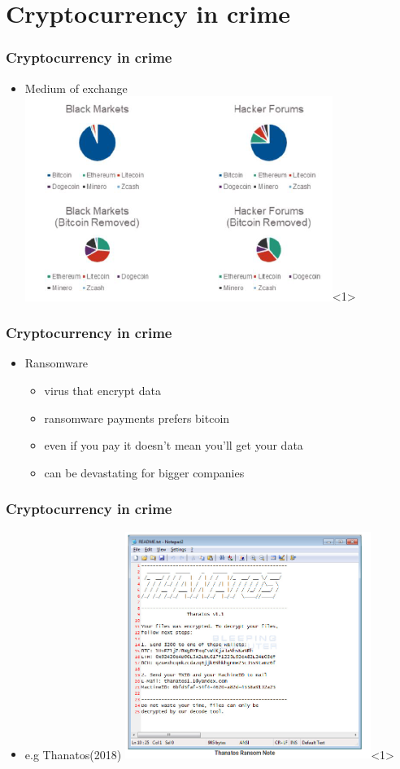 \documentclass{beamer}
\begin{document}
\section{Cryptocurrency in crime}
\begin{frame}
\frametitle{Cryptocurrency in crime}
    \begin{itemize}
        \item<1> Medium of exchange
        \includegraphics[width=100mm]{exchange-chart.png}<1>
    \end{itemize}
\end{frame}
\begin{frame}
    \frametitle{Cryptocurrency in crime}
        \begin{itemize}
            \item<1-> Ransomware
            \begin{itemize}
                \item<2-> virus that encrypt data
                \item<3-> ransomware payments prefers bitcoin
                \item<4-> even if you pay it doesn't mean you'll get your data
                \item<5-> can be devastating for bigger companies 
            \end{itemize}
        \end{itemize}
\end{frame}
\begin{frame}
    \frametitle{Cryptocurrency in crime}
        \begin{itemize}
            \item<1> e.g Thanatos(2018)
            \includegraphics[width=80mm]{thanatos-chart.png}<1>
        \end{itemize}
\end{frame}
\end{document}
